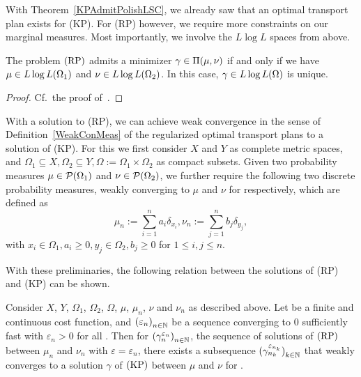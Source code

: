 With Theorem~\ref{KPAdmitPolishLSC}, we already saw that an optimal transport plan exists for (KP). For (RP) however, we require more constraints on our marginal measures. Most importantly, we involve the $L \log L$ spaces from above.

\begin{theorem}\label{RegProbAdmitLLL}
	The problem$\text{\normalfont\ (RP)}$ admits a minimizer $\gamma \in \TP{\mu}{\nu}$ if and only if we have $\mu \in \LLL[\Omega_1]$ and $\nu \in \LLL[\Omega_2]$. In this case, $\gamma \in \LLL$ is unique.
\end{theorem}

\begin{proof}
	Cf.~the proof of\ \cite[Theorem~3.3]{Cla2021}.
\end{proof}

With a solution to (RP), we can achieve weak convergence in the sense of Definition~\ref{WeakConMeas} of the regularized optimal transport plans to a solution of (KP). For this we first consider $X$ and $Y$ as complete metric spaces, and $\Omega_1 \subseteq X, \Omega_2 \subseteq Y, \Omega := \Omega_1 \times \Omega_2$ as compact subsets. Given two probability measures $\mu \in \PM{\Omega_1}$ and $\nu \in \PM{\Omega_2}$, we further require the following two discrete probability measures, weakly converging to $\mu$ and $\nu$ for \Ninf{} respectively, which are defined as
\[ \mu_n := \sum_{i = 1}^n a_i \delta_{x_i}, \nu_n := \sum_{j = 1}^n b_j \delta_{y_j}, \]
with $x_i \in \Omega_1, a_i \ge 0, y_j \in \Omega_2, b_j \ge 0$ for $1 \le i, j \le n$.

With these preliminaries, the following relation between the solutions of (RP) and (KP) can be shown.

\begin{theorem}\label{RelatRegSolOrigSolPlan}
	Consider $X$, $Y$, $\Omega_1$, $\Omega_2$, $\Omega$, $\mu$, $\mu_n$, $\nu$ and $\nu_n$ as described above. Let \map[c]{\Omega}{\RZero} be a finite and continuous cost function, and ${(\varepsilon_n)}_{\NinN}$ be a sequence converging to $0$ sufficiently fast with $\varepsilon_n > 0$ for all \NinN. Then for ${(\gamma_n^{\varepsilon_n})}_{\NinN}$, the sequence of solutions of$\text{\normalfont\ (RP)}$ between $\mu_n$ and $\nu_n$ with $\varepsilon = \varepsilon_n$, there exists a subsequence ${(\gamma_{n_k}^{\varepsilon_{n_k}})}_{\NinN[k]}$ that weakly converges to a solution $\gamma$ of$\text{\normalfont\ (KP)}$ between $\mu$ and $\nu$ for \Ninf.
\end{theorem}

